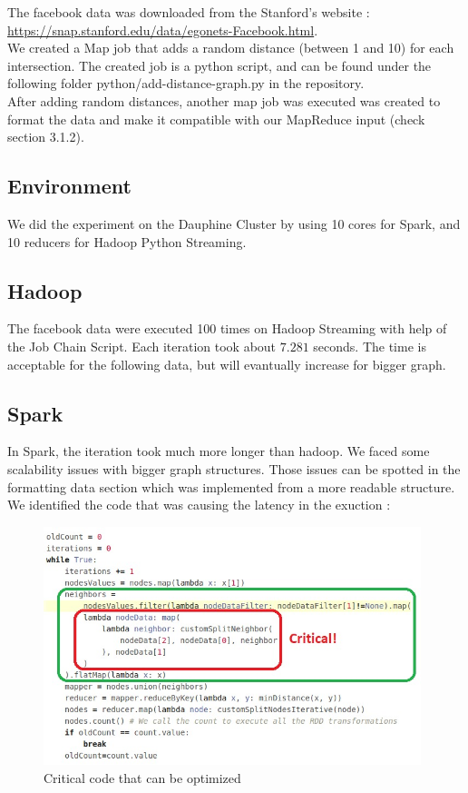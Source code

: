 \documentclass[english]{article}
\begin{document}
The facebook data was downloaded from the Stanford's website :\\  \href{https://snap.stanford.edu/data/egonets-Facebook.html}{https://snap.stanford.edu/data/egonets-Facebook.html}.\\

We created a Map job that adds a random distance (between 1 and 10) for each intersection. The created job is a python script, and can be found under the following folder python/add-distance-graph.py in the repository. \\

After adding random distances, another map job was executed was created to format the data and make it compatible with our MapReduce input (check section 3.1.2).
 
\subsection{Environment}
We did the experiment on the Dauphine Cluster by using 10 cores for Spark, and 10 reducers for Hadoop Python Streaming.

\subsection{Hadoop}
The facebook data were executed 100 times on Hadoop Streaming with help of the Job Chain Script. Each iteration took about $7.281$ seconds. The time is acceptable for the following data, but will evantually increase for bigger graph.\\

\newpage
\subsection{Spark}
In Spark, the iteration took much more longer than hadoop.
We faced some scalability issues with bigger graph structures. Those issues can be spotted in the formatting data section which was implemented from a more readable structure. We identified the code that was causing the latency in the exuction :\\

\begin{figure}[h]
\centering
\includegraphics[width=11cm]{img/critical.jpeg}
\caption{Critical code that can be optimized}
\end{figure}
\end{document}
